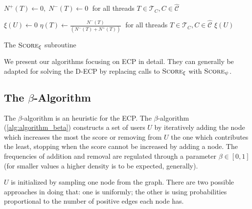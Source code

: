 \begin{algorithm}
	\SetAlgoLined
	$N^{+} (T) \leftarrow 0, \; N^{-} (T) \leftarrow 0\; $ for all threads $T
		\in \mathcal{T}_{C}, C \in \mathcal{\hat{C}}   $ \;


	$\xi(U) \leftarrow 0$ \;
	$\eta(T) \leftarrow\frac{N^{-}(T)}{(N^{-}(T) + N^{+} (T))} \; $ for all threads $T
		\in \mathcal{T}_{C}, C \in \mathcal{\hat{C}}   $  \;
	\Return $\xi(U)$ \;

	\caption{The $\textsc{Score}_{\xi}  $ subroutine}
	\label{alg:score_xi}
\end{algorithm}

We present our algorithms focusing on \acrshort{ECP} in detail. They can generally be
adapted for solving the \acrshort{D-ECP} by replacing calls to
$\textsc{Score}_{\xi}$ with $\textsc{Score}_{\psi}$.

\subsection{The $\beta$-Algorithm}%
\label{ssub:the_beta_approach}

The $\beta$-algorithm is an heuristic for the \acrshort{ECP}. The
$\beta$-algorithm (\autoref{alg:algorithm_beta}) constructs a set of users $U$ by
iteratively adding the node which increases the most the score or removing from
$U$ the one which contributes the least, stopping when the score cannot be
increased by adding a node. The frequencies of addition and removal are regulated
through a parameter $\beta \in [0, 1]$ (for smaller values a higher density is to be expected,
generally).

$U$ is initialized by sampling one node from the graph. There are two possible
approaches in doing that: one is uniformly;
the other is using probabilities proportional to the number
of positive edges each node has.

